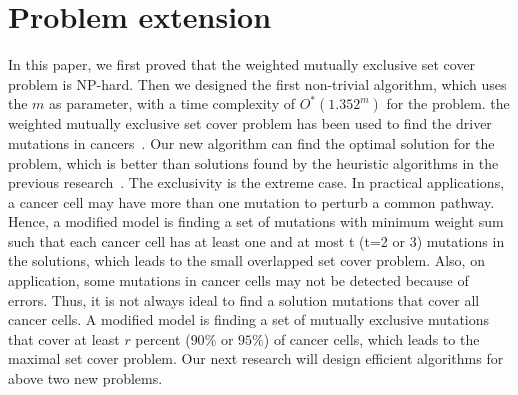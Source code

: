 \documentclass[11pt]{article}
\begin{document}
\section{Problem extension}
In this paper, we first proved that the {\sc weighted mutually
exclusive set cover} problem is NP-hard. Then we designed the
first non-trivial algorithm, which uses the $m$ as parameter, with
a time complexity of $O^*(1.352^m)$ for the problem. the {\sc
weighted mutually exclusive set cover} problem has been used to
find the driver mutations in cancers~\cite{Ciriello,Miller}. Our
new algorithm can find the optimal solution for the problem, which
is better than solutions found by the heuristic algorithms in the
previous research~\cite{Ciriello,Miller}. The exclusivity is the
extreme case. In practical applications, a cancer cell may have
more than one mutation to perturb a common pathway. Hence, a
modified model is finding a set of mutations with minimum weight
sum such that each cancer cell has at least one and at most t (t=2
or 3) mutations in the solutions, which leads to the {\sc small
overlapped set cover} problem. Also, on application, some
mutations in cancer cells may not be detected because of errors.
Thus, it is not always ideal to find a solution mutations that
cover all cancer cells. A modified model is finding a set of
mutually exclusive mutations that cover at least $r$ percent
($90\%$ or $95\%$) of cancer cells, which leads to the {\sc
maximal set cover} problem. Our next research will design
efficient algorithms for above two new problems.
\end{document}
